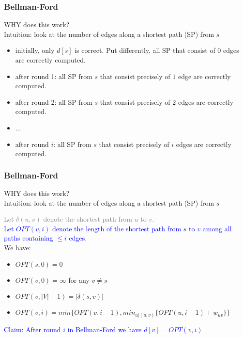   \begin{frame}[fragile]
  \frametitle{Bellman-Ford}
WHY does this work?\\
Intuition:  look at the number of edges along a shortest path (SP) from $s$
 
\begin{itemize} 
\item initially, only $d[s]$ is correct. Put differently, all SP that consist of  $0$ edges are correctly computed.
 
\item after round 1: all SP from $s$ that consist precisely of $1$ edge are correctly computed. 
 
\item after round 2: all SP from $s$ that consist precisely of $2$ edges are correctly computed. 

\item ...
\item after round $i$: all SP from $s$ that consist precisely of $i$ edges are correctly computed. 
\end{itemize} 
\end{frame} 



  \begin{frame}[fragile]
  \frametitle{Bellman-Ford}
WHY does this work?\\
Intuition:  look at the number of edges along a shortest path (SP) from $s$

\textcolor{gray}{Let $\delta(u,v)$ denote the shortest path from $u$ to $v$.}\\
\textcolor{blue}{Let $OPT(v,i)$ denote the length of the shortest path from $s$ to $v$ among all paths containing $\le i$ edges.} \\
 We have:
\begin{itemize} 

\item $OPT(s,0) = 0$

\item $OPT(v,0) = \infty$ for any $v \neq s$

\item $OPT(v, |V|-1) = |\delta(s,v)|$

\item $OPT(v,i) = min \{OPT(v, i-1), min_{u | (u,v)} \{ OPT(u,i-1) + w_{uv}\} \}$
\end{itemize} 

\textcolor{blue}{ Claim: After round $i$ in Bellman-Ford we have $d[v] = OPT(v,i)$}
\end{frame} 




